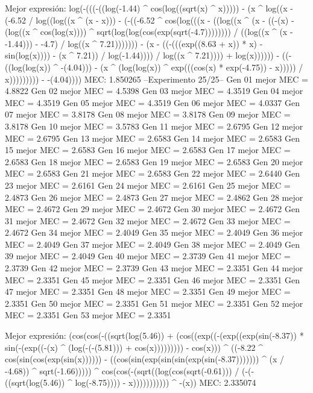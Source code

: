 Mejor expresión: log(-(((-((log(-1.44) ^ cos(log((sqrt(x) ^ x))))) - (x ^ log((x - (-6.52 / log((log((x ^ (x - x))) - (-((-6.52 ^ cos(log(((x - ((log((x ^ (x - ((-(x) - (log((x ^ cos(log(x)))) ^ sqrt(log(log(cos(exp(sqrt(-4.7)))))))) / ((log((x ^ (x - -1.44))) - -4.7) / log((x ^ 7.21))))))) - (x - ((-(((exp((8.63 + x)) * x) - sin(log(x)))) - (x ^ 7.21)) / log(-1.44)))) / log((x ^ 7.21)))) + log(x)))))) - ((-((log(log(x)) ^ -(4.04))) - (x ^ (log(log(x)) ^ exp(((cos(x) * exp(-4.75)) - x))))) / x))))))))) - -(4.04))))
MEC: 1.850265
--Experimento 
 25/25--
Gen 01 mejor MEC = 4.8822
Gen 02 mejor MEC = 4.5398
Gen 03 mejor MEC = 4.3519
Gen 04 mejor MEC = 4.3519
Gen 05 mejor MEC = 4.3519
Gen 06 mejor MEC = 4.0337
Gen 07 mejor MEC = 3.8178
Gen 08 mejor MEC = 3.8178
Gen 09 mejor MEC = 3.8178
Gen 10 mejor MEC = 3.5783
Gen 11 mejor MEC = 2.6795
Gen 12 mejor MEC = 2.6795
Gen 13 mejor MEC = 2.6583
Gen 14 mejor MEC = 2.6583
Gen 15 mejor MEC = 2.6583
Gen 16 mejor MEC = 2.6583
Gen 17 mejor MEC = 2.6583
Gen 18 mejor MEC = 2.6583
Gen 19 mejor MEC = 2.6583
Gen 20 mejor MEC = 2.6583
Gen 21 mejor MEC = 2.6583
Gen 22 mejor MEC = 2.6440
Gen 23 mejor MEC = 2.6161
Gen 24 mejor MEC = 2.6161
Gen 25 mejor MEC = 2.4873
Gen 26 mejor MEC = 2.4873
Gen 27 mejor MEC = 2.4862
Gen 28 mejor MEC = 2.4672
Gen 29 mejor MEC = 2.4672
Gen 30 mejor MEC = 2.4672
Gen 31 mejor MEC = 2.4672
Gen 32 mejor MEC = 2.4672
Gen 33 mejor MEC = 2.4672
Gen 34 mejor MEC = 2.4049
Gen 35 mejor MEC = 2.4049
Gen 36 mejor MEC = 2.4049
Gen 37 mejor MEC = 2.4049
Gen 38 mejor MEC = 2.4049
Gen 39 mejor MEC = 2.4049
Gen 40 mejor MEC = 2.3739
Gen 41 mejor MEC = 2.3739
Gen 42 mejor MEC = 2.3739
Gen 43 mejor MEC = 2.3351
Gen 44 mejor MEC = 2.3351
Gen 45 mejor MEC = 2.3351
Gen 46 mejor MEC = 2.3351
Gen 47 mejor MEC = 2.3351
Gen 48 mejor MEC = 2.3351
Gen 49 mejor MEC = 2.3351
Gen 50 mejor MEC = 2.3351
Gen 51 mejor MEC = 2.3351
Gen 52 mejor MEC = 2.3351
Gen 53 mejor MEC = 2.3351

Mejor expresión: (cos(cos(-((sqrt(log(5.46)) + (cos((exp((-(exp((exp(sin(-8.37)) * sin(-(exp((-(x) ^ (log(-(-(5.81))) + cos(x))))))))) - cos(x))) ^ ((-8.22 ^ cos(sin(cos(exp(sin(x)))))) - ((cos(sin(exp(sin(sin(exp(sin(-8.37))))))) ^ (x / -4.68)) ^ sqrt(-1.66))))) ^ cos(cos(-(sqrt((log(cos(sqrt(-0.61))) / (-(-((sqrt(log(5.46)) ^ log(-8.75)))) - x))))))))))) ^ -(x))
MEC: 2.335074
